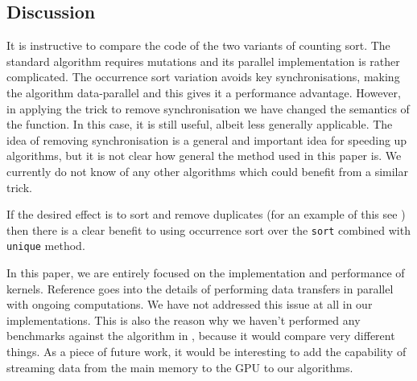 
\subsection {Discussion} 

It is instructive to compare the code of the two variants of counting
sort. The standard algorithm requires mutations and its parallel
implementation is rather complicated. The occurrence sort variation
avoids key synchronisations, making the algorithm
data-parallel and this gives it a performance advantage. However, in
applying the trick to remove synchronisation we have changed the
semantics of the function. In this case, it is still useful, albeit less
generally applicable. The idea of removing synchronisation is a
general and important idea for speeding up algorithms, but it is not
clear how general the method used in this paper is.  We currently do
not know of any other algorithms which could benefit from a similar
trick.

If the desired effect is to sort and remove duplicates 
(for an example of this see \cite{REMOVEDUPS}) then 
there is a clear benefit to using occurrence sort
over the {\tt sort} combined with {\tt unique} method. 

In this paper, we are entirely focused on the implementation and
performance of kernels. Reference \cite{CSORT} goes into the details
of performing data transfers in parallel with ongoing computations. We
have not addressed this issue at all in our implementations. This is
also the reason why we haven't performed any benchmarks against the algorithm in
\cite{CSORT}, because it would compare very different things. As a
piece of future work, it would be interesting to add the capability of
streaming data from the main memory to the GPU to our algorithms.

